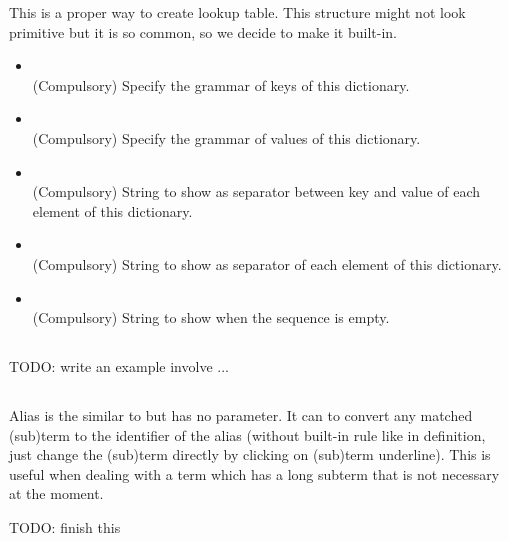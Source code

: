 This is a proper way to create lookup table. This structure might not look primitive but it is so common, so we decide to make it built-in.

\begin{itemize}
    \item \kKeyGrammar {} \\
    (Compulsory) Specify the grammar of keys of this dictionary.
    \item \kValueGrammar {} \\
    (Compulsory) Specify the grammar of values of this dictionary.
    \item \kSeparator {} \\
    (Compulsory) String to show as separator between key and value of each element of this dictionary.
    \item \kDelimiter {} \\
    (Compulsory) String to show as separator of each element of this dictionary.
    \item \kWhenEmpty {} \\
    (Compulsory) String to show when the sequence is empty.
\end{itemize}

\subsection{\kDefinition {}}
TODO: write an example involve \kLet ... \kBe

\subsection{\kAlias {}}
Alias is the similar to \kDefinition but has no parameter. It can to convert any matched (sub)term to the identifier of the alias (without built-in rule like in definition, just change the (sub)term directly by clicking on (sub)term underline). This is useful when dealing with a term which has a long subterm that is not necessary at the moment.

TODO: finish this


